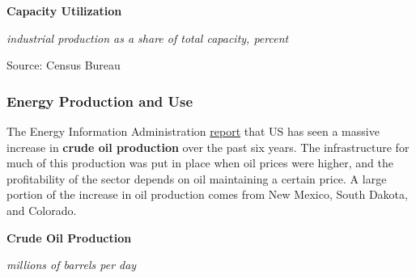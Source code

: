 \documentclass{report}
\makeatletter
\newcommand{\tbllink}[1]{\href{https://raw.githubusercontent.com/bdecon/US-chartbook/master/chartbook/data/#1}{\faTable}}
\newcommand*\short[1]{\expandafter\@gobbletwo\number\numexpr#1\relax}
\newcommand{\stdnode}[3]{\node[below, align=left, shift=({#1,#2})]{#3};}
\newcommand{\dateaxisticks}{
		date coordinates in=x, axis line style={draw=none},
		xmax={2020-10-01},
		max space between ticks=40,	    
		xtick={{1990-01-01}, {1992-01-01}, {1994-01-01}, 
			{1996-01-01}, {1998-01-01}, {2000-01-01}, 
			{2002-01-01}, {2004-01-01}, {2006-01-01},
			{2008-01-01}, {2010-01-01}, {2012-01-01}, {2014-01-01},
		    {2016-01-01}, {2018-01-01}, {2020-01-01}},
		minor xtick={{1989-01-01}, {1991-01-01}, {1993-01-01},
			{1995-01-01}, {1997-01-01}, {1999-01-01}, 
			{2001-01-01}, {2003-01-01}, {2005-01-01}, {2007-01-01},
		    {2009-01-01}, {2011-01-01}, {2013-01-01}, {2015-01-01},
		    {2017-01-01}, {2019-01-01}},
		enlarge y limits={0.06}, enlarge x limits={0.01},
		}
\newcommand{\bbar}[2]{extra #1 ticks = {{#2}}, extra #1 tick labels = ,
		extra #1 tick style = {grid=major, grid style={thick, black!25}},}
\newcommand{\stdline}[4]{\addplot[very thick, no markers, color=#1] 
		table [x=#2, y=#3, col sep=comma] {#4};	}
\newcommand{\thickline}[4]{\addplot[ultra thick, no markers, color=#1] 
		table [x=#2, y=#3, col sep=comma] {#4};	}
\newcommand{\rbars}{
		\fill[color=black!10] (axis cs:{1990-07-01},\pgfkeysvalueof{/pgfplots/ymin}) rectangle 
			(axis cs:{1991-03-01}, \pgfkeysvalueof{/pgfplots/ymax});
		\fill[color=black!10] (axis cs:{2007-12-01},\pgfkeysvalueof{/pgfplots/ymin}) rectangle 
			(axis cs:{2009-07-01}, \pgfkeysvalueof{/pgfplots/ymax});
		\fill[color=black!10] (axis cs:{2001-03-01},\pgfkeysvalueof{/pgfplots/ymin}) rectangle 
			(axis cs:{2001-11-01}, \pgfkeysvalueof{/pgfplots/ymax});
		\fill[color=black!10] (axis cs:{2020-02-01},\pgfkeysvalueof{/pgfplots/ymin}) rectangle 
			(axis cs:{2020-10-01}, \pgfkeysvalueof{/pgfplots/ymax});}
\makeatother
\begin{document}
{{{{\begin{minipage}{0.76\textwidth}
\normalsize \textbf{Capacity Utilization}

\footnotesize{\textit{industrial production as a share of total capacity, percent}}

\hspace*{-2mm} 

\footnotesize{Source: Census Bureau} \hfill \tbllink{tcu.csv}
\end{minipage}
\newpage
\subsubsection*{\color{black!70} \seriffont Energy Production and Use}
\begin{minipage}{0.76\textwidth}
\small The Energy Information Administration \href{https://www.eia.gov/dnav/pet/pet_crd_crpdn_adc_mbblpd_m.htm}{report} that US has seen a massive increase in \textbf{crude oil production} over the past six years. The infrastructure for much of this production was put in place when oil prices were higher, and the profitability of the sector depends on oil maintaining a certain price. A large portion of the increase in oil production comes from New Mexico, South Dakota, and Colorado. 

\vspace{4mm}

\normalsize \textbf{Crude Oil Production}

\footnotesize{\textit{millions of barrels per day}}


\end{minipage}}}}}
\end{document}
